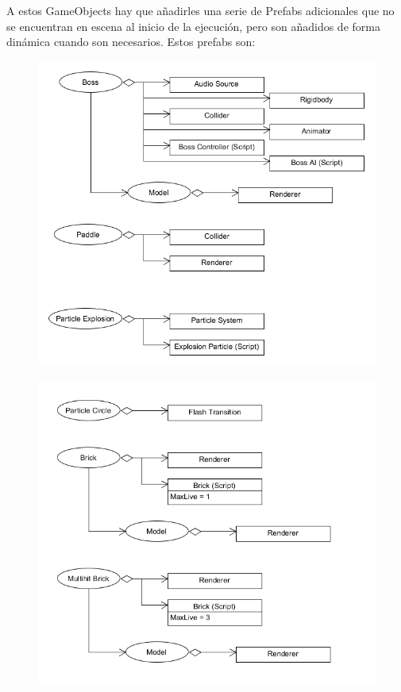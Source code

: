 \clearpage 
A estos GameObjects hay que añadirles una serie de Prefabs adicionales que no se encuentran en escena al inicio de la ejecución, pero son añadidos de forma dinámica cuando son necesarios. Estos prefabs son:
\begin{figure}[h]
	\includegraphics[width=1\textwidth]{images/estructura/clases/room-prefab-1}
	\centering
\end{figure}

\begin{figure}[h]
	\includegraphics[width=1\textwidth]{images/estructura/clases/room-prefab-2}
	\centering
\end{figure}

